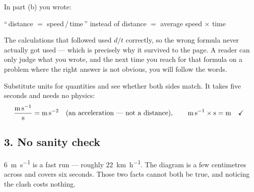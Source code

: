 \documentclass[11pt]{article}
\begin{document}
In part (b) you wrote:

\begin{center}
\textcolor{wrongcol}{``\,distance $=$ speed\,/\,time\,''}
\qquad instead of \qquad
\textcolor{rightcol}{distance $=$ average speed $\times$ time}
\end{center}

The calculations that followed used $d/t$ correctly, so the wrong formula never actually
got used --- which is precisely why it survived to the page. A reader can only judge what
you wrote, and the next time you reach for that formula on a problem where the right
answer is not obvious, you will follow the words.

\begin{habit}
Substitute units for quantities and see whether both sides match. It takes five seconds
and needs no physics:
\[
\frac{\si{\metre\per\second}}{\si{\second}} = \si{\metre\per\second\squared}
\quad\text{(an acceleration --- not a distance)},
\qquad
\si{\metre\per\second} \times \si{\second} = \si{\metre} \quad\text{\checkmark}
\]
\end{habit}

\subsection*{3. No sanity check}

\SI{6}{\metre\per\second} is a fast run --- roughly \SI{22}{\kilo\metre\per\hour}. The
diagram is a few centimetres across and covers six seconds. Those two facts cannot both
be true, and noticing the clash costs nothing.

\begin{center}
\end{center}
\end{document}
